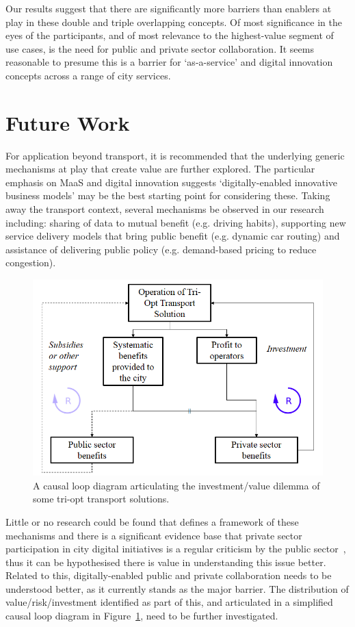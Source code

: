\documentclass[b5paper,10pt]{article}
\begin{document}
Our results suggest that there are significantly more barriers than
enablers at play in these double and triple overlapping concepts. Of
most significance in the eyes of the participants, and of most
relevance to the highest-value segment of use cases, is the need for
public and private sector collaboration. It seems reasonable to
presume this is a barrier for `as-a-service' and digital innovation
concepts across a range of city services.

\section{Future Work}\label{future}

For application beyond transport, it is recommended that the
underlying generic mechanisms at play that create value are further
explored. The particular emphasis on MaaS and digital innovation
suggests `digitally-enabled innovative business models' may be the
best starting point for considering these. Taking away the transport
context, several mechanisms be observed in our research including:
sharing of data to mutual benefit (e.g. driving habits), supporting
new service delivery models that bring public benefit (e.g. dynamic
car routing) and assistance of delivering public policy
(e.g. demand-based pricing to reduce congestion).

\begin{figure}[!h]
\centering
\includegraphics[width=0.7\columnwidth]{images/causalloop.png}
\caption{A causal loop diagram articulating the investment/value
  dilemma of some tri-opt transport solutions.}
\label{fig:causalloop}
\end{figure}

Little or no research could be found that defines a framework of these
mechanisms and there is a significant evidence base that private
sector participation in city digital initiatives is a regular
criticism by the public sector~\citep{martin:2016}, thus it can be
hypothesised there is value in understanding this issue
better. Related to this, digitally-enabled public and private
collaboration needs to be understood better, as it currently stands as
the major barrier. The distribution of value/risk/investment
identified as part of this, and articulated in a simplified causal
loop diagram in Figure~\ref{fig:causalloop}, need to be further
investigated.
\end{document}
